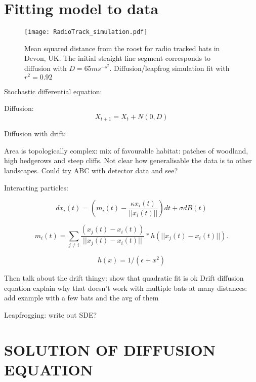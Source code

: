 \section{Fitting model to data}

\begin{figure} [h]
    \centering
        \texttt{[image: RadioTrack\_simulation.pdf]}
        \caption{Mean squared distance from the roost for radio tracked bats in Devon, UK. The initial straight line segment corresponds to diffusion with $D = 65 ms^{-s^2}$. Diffusion/leapfrog simulation fit with $r^2 = 0.92$}
    \label{fig:radiotrack_fit}
\end{figure}

Stochastic differential equation:

Diffusion:
\begin{equation}
X_{t+1} = X_t + N(0,D)
\end{equation}

Diffusion with drift:








Area is topologically complex: mix of favourable habitat: patches of woodland, high hedgerows and steep cliffs. Not clear how generalisable the data is to other landscapes. Could try ABC with detector data and see?

Interacting particles:

\begin{equation}
dx_i(t) = (m_i(t) - \frac{\kappa x_i(t)}{||x_i(t)||}) dt + \sigma dB(t)
\end{equation}

\begin{equation}
m_i(t) = \sum_{j \neq i} \frac{(x_j(t) - x_i(t))}{||x_j(t) - x_i(t)||} * h(||x_j(t) - x_i(t)||).
\end{equation}

\begin{equation}
h(x) = 1/(\epsilon + x^2)
\end{equation}

Then talk about the drift thingy:
show that quadratic fit is ok
Drift diffusion equation
explain why that doesn't work with multiple bats at many distances: add example with a few bats and the avg of them

Leapfrogging: write out SDE?



\section{SOLUTION OF DIFFUSION EQUATION}

